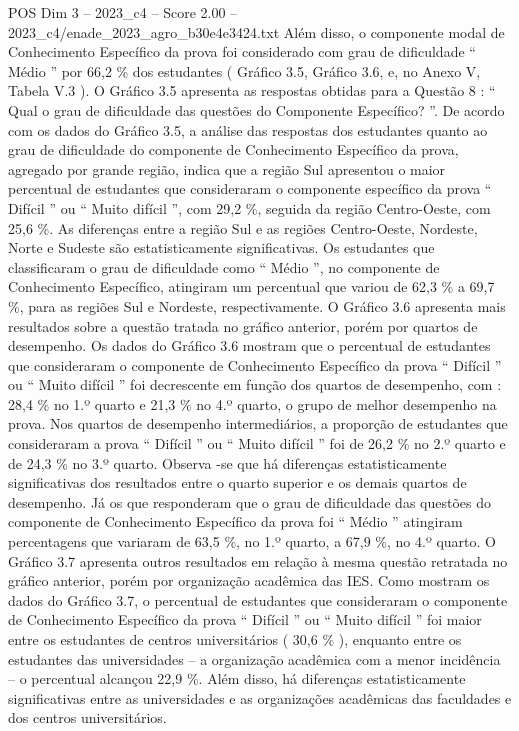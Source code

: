 \begin{textsample}{POS Dim 3 – 2023\_c4 – Score 2.00 – 2023\_c4/enade\_2023\_agro\_b30e4e3424.txt}
Além disso, o componente modal de Conhecimento Específico da prova foi considerado com grau de dificuldade “ Médio ” por 66,2 \% dos estudantes ( Gráfico 3.5, Gráfico 3.6, e, no Anexo V, Tabela V.3 ).
O Gráfico 3.5 apresenta as respostas obtidas para a Questão 8 : “ Qual o grau de dificuldade das questões do Componente Específico? ”.
De acordo com os dados do Gráfico 3.5, a análise das respostas dos estudantes quanto ao grau de dificuldade do componente de Conhecimento Específico da prova, agregado por grande região, indica que a região Sul apresentou o maior percentual de estudantes que consideraram o componente específico da prova “ Difícil ” ou “ Muito difícil ”, com 29,2 \%, seguida da região Centro-Oeste, com 25,6 \%.
As diferenças entre a região Sul e as regiões Centro-Oeste, Nordeste, Norte e Sudeste são estatisticamente significativas.
Os estudantes que classificaram o grau de dificuldade como “ Médio ”, no componente de Conhecimento Específico, atingiram um percentual que variou de 62,3 \% a 69,7 \%, para as regiões Sul e Nordeste, respectivamente.
O Gráfico 3.6 apresenta mais resultados sobre a questão tratada no gráfico anterior, porém por quartos de desempenho.
Os dados do Gráfico 3.6 mostram que o percentual de estudantes que consideraram o componente de Conhecimento Específico da prova “ Difícil ” ou “ Muito difícil ” foi decrescente em função dos quartos de desempenho, com : 28,4 \% no 1.º quarto e 21,3 \% no 4.º quarto, o grupo de melhor desempenho na prova.
Nos quartos de desempenho intermediários, a proporção de estudantes que consideraram a prova “ Difícil ” ou “ Muito difícil ” foi de 26,2 \% no 2.º quarto e de 24,3 \% no 3.º quarto.
Observa -se que há diferenças estatisticamente significativas dos resultados entre o quarto superior e os demais quartos de desempenho.
Já os que responderam que o grau de dificuldade das questões do componente de Conhecimento Específico da prova foi “ Médio ” atingiram percentagens que variaram de 63,5 \%, no 1.º quarto, a 67,9 \%, no 4.º quarto.
O Gráfico 3.7 apresenta outros resultados em relação à mesma questão retratada no gráfico anterior, porém por organização acadêmica das IES.
Como mostram os dados do Gráfico 3.7, o percentual de estudantes que consideraram o componente de Conhecimento Específico da prova “ Difícil ” ou “ Muito difícil ” foi maior entre os estudantes de centros universitários ( 30,6 \% ), enquanto entre os estudantes das universidades – a organização acadêmica com a menor incidência – o percentual alcançou 22,9 \%.
Além disso, há diferenças estatisticamente significativas entre as universidades e as organizações acadêmicas das faculdades e dos centros universitários.

\end{textsample}
